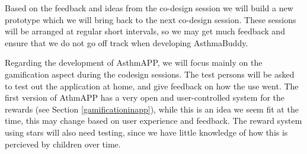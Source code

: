 Based on the feedback and ideas from the co-design session we will build a new prototype which we will bring back to the next co-design session. These sessions will be arranged at regular short intervals, so we may get much feedback and ensure that we do not go off track when developing AsthmaBuddy.

Regarding the development of AsthmAPP, we will focus mainly on the gamification aspect during the codesign sessions. The test persons will be asked to test out the application at home, and give feedback on how the use went. The first version of AthmAPP has a very open and user-controlled system for the rewards (see Section \ref{gamificationinapp}), while this is an idea we seem fit at the time, this may change based on user experience and feedback. The reward system using stars will also need testing, since we have little knowledge of how this is percieved by children over time.

